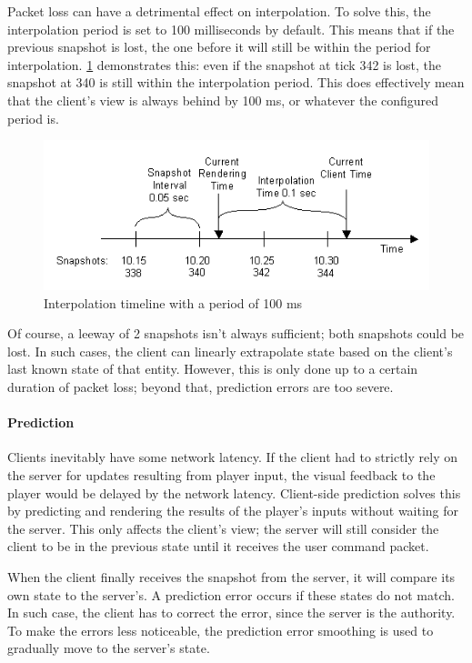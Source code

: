 \documentclass[a4paper, 12pt]{scrartcl}
\begin{document}
Packet loss can have a detrimental effect on interpolation. To solve this, the interpolation period is set to 100 milliseconds by default. This means that if the previous snapshot is lost, the one before it will still be within the period for interpolation. \cref{fig:source_net_interp} demonstrates this: even if the snapshot at tick 342 is lost, the snapshot at 340 is still within the interpolation period. This does effectively mean that the client's view is always behind by 100 ms, or whatever the configured period is.

\begin{figure}[!htp]
  \centering
  \includegraphics[width=0.66\linewidth]{images/source_net_interp.png}
  \caption{Interpolation timeline with a period of 100 ms}
  \label{fig:source_net_interp}
\end{figure}

Of course, a leeway of 2 snapshots isn't always sufficient; both snapshots could be lost. In such cases, the client can linearly extrapolate state based on the client's last known state of that entity. However, this is only done up to a certain duration of packet loss; beyond that, prediction errors are too severe.

\paragraph{Prediction}
Clients inevitably have some network latency. If the client had to strictly rely on the server for updates resulting from player input, the visual feedback to the player would be delayed by the network latency. Client-side prediction solves this by predicting and rendering the results of the player's inputs without waiting for the server. This only affects the client's view; the server will still consider the client to be in the previous state until it receives the user command packet.

When the client finally receives the snapshot from the server, it will compare its own state to the server's. A prediction error occurs if these states do not match. In such case, the client has to correct the error, since the server is the authority. To make the errors less noticeable, the prediction error smoothing is used to gradually move to the server's state.
\end{document}
